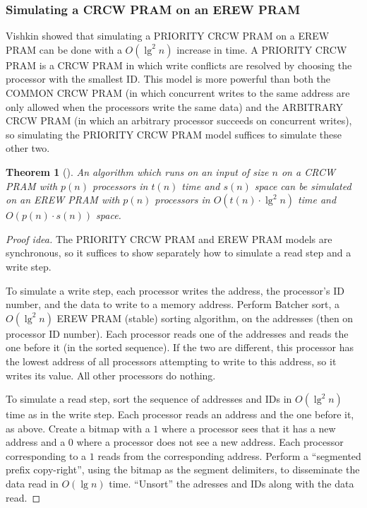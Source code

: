 \documentclass{article}
\newtheorem{theorem}{Theorem}
\newenvironment{idea}{\begin{proof}[Proof idea]}{\end{proof}}
\begin{document}
\subsubsection{Simulating a CRCW PRAM on an EREW PRAM}

Vishkin showed that simulating a PRIORITY CRCW PRAM on a EREW PRAM can be done with a $O(\lg^2 n)$ increase in time.
A PRIORITY CRCW PRAM is a CRCW PRAM in which write conflicts are resolved by choosing the processor with the smallest ID.
This model is more powerful than both the COMMON CRCW PRAM (in which concurrent writes to the same address are only allowed when the processors write the same data) and the ARBITRARY CRCW PRAM (in which an arbitrary processor succeeds on concurrent writes), so simulating the PRIORITY CRCW PRAM model suffices to simulate these other two.

\begin{theorem}[\cite{vishkin83}]
  An algorithm which runs on an input of size $n$ on a CRCW PRAM with $p(n)$ processors in $t(n)$ time and $s(n)$ space can be simulated on an EREW PRAM with $p(n)$ processors in $O(t(n)\cdot \lg^2 n)$ time and $O(p(n) \cdot s(n))$ space.
\end{theorem}
\begin{idea}
  The PRIORITY CRCW PRAM and EREW PRAM models are synchronous, so it suffices to show separately how to simulate a read step and a write step.

  To simulate a write step, each processor writes the address, the processor's ID number, and the data to write to a memory address.
  Perform Batcher sort, a $O(\lg^2 n)$ EREW PRAM (stable) sorting algorithm, on the addresses (then on processor ID number).
  Each processor reads one of the addresses and reads the one before it (in the sorted sequence).
  If the two are different, this processor has the lowest address of all processors attempting to write to this address, so it writes its value.
  All other processors do nothing.

  To simulate a read step, sort the sequence of addresses and IDs in $O(\lg^2 n)$ time as in the write step.
  Each processor reads an address and the one before it, as above.
  Create a bitmap with a $1$ where a processor sees that it has a new address and a $0$ where a processor does not see a new address.
  Each processor corresponding to a $1$ reads from the corresponding address.
  Perform a ``segmented prefix copy-right'', using the bitmap as the segment delimiters, to disseminate the data read in $O(\lg n)$ time.
  ``Unsort'' the adresses and IDs along with the data read.
\end{idea}
\end{document}
